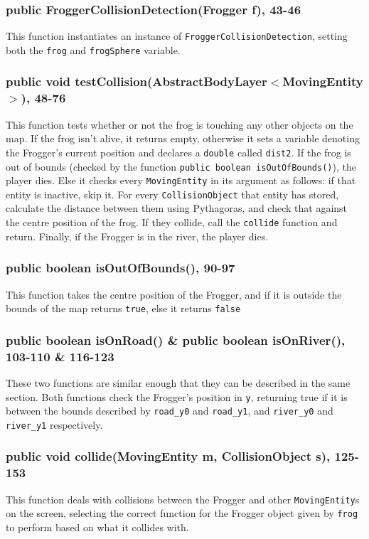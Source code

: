 \documentclass[12pt]{article}
\begin{document}
\subsubsection{public FroggerCollisionDetection(Frogger f), 43-46}
This function instantiates an instance of \verb|FroggerCollisionDetection|, setting both the \verb|frog| and \verb|frogSphere| variable.

\subsubsection{public void testCollision(AbstractBodyLayer$<$MovingEntity$>$), 48-76}
This function tests whether or not the frog is touching any other objects on the map.
If the frog isn't alive, it returns empty, otherwise it sets a variable denoting the Frogger's current position and declares a \verb|double| called \verb|dist2|.
If the frog is out of bounds (checked by the function \verb|public boolean isOutOfBounds()|), the player dies.
Else it checks every \verb|MovingEntity| in its argument as follows: if that entity is inactive, skip it.
For every \verb|CollisionObject| that entity has stored, calculate the distance between them using Pythagoras, and check that against the centre position of the frog.
If they collide, call the \verb|collide| function and return.
Finally, if the Frogger is in the river, the player dies.

\subsubsection{public boolean isOutOfBounds(), 90-97}
This function takes the centre position of the Frogger, and if it is outside the bounds of the map returns \verb|true|, else it returns \verb|false|

\subsubsection{public boolean isOnRoad() \& public boolean isOnRiver(), 103-110 \& 116-123}
These two functions are similar enough that they can be described in the same section.
Both functions check the Frogger's position in \verb|y|, returning true if it is between the bounds described by \verb|road_y0| and \verb|road_y1|, and \verb|river_y0| and \verb|river_y1| respectively.

\subsubsection{public void collide(MovingEntity m, CollisionObject s), 125-153}
This function deals with collisions between the Frogger and other \verb|MovingEntity|s on the screen, selecting the correct function for the Frogger object given by \verb|frog| to perform based on what it collides with.
\end{document}
